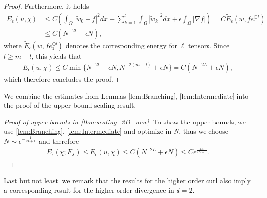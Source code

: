 \documentclass[a4paper, 10pt, twoside, notitlepage]{amsart}
\theoremstyle{plain}
\begin{document}
\begin{proof}
			Furthermore, it holds
			\begin{align*}
				E_{\epsilon}(u,\chi) &\leq C \left(\int_\Omega |\tilde{w}_0 - f|^2 dx + \sum_{k=1}^{l} \int_\Omega |\tilde{w}_k|^2 dx+ \epsilon \int_\Omega |\nabla f| \right) = C \tilde{E}_\epsilon(w,fe_1^{\odot l})\\
				& \leq C (N^{-2l} + \epsilon N),
			\end{align*}
			where $\tilde{E}_\epsilon(w,fe_1^{\odot l})$ denotes the corresponding energy for $\ell$ tensors.
                      Since $l \geq m-l$, this yields that
                        \begin{align*}
				E_\epsilon(u,\chi) \leq C \min\{ N^{-2l} + \epsilon N, N^{-2(m-l)} + \epsilon N\} = C(N^{-2L} + \epsilon N),
			\end{align*}
                        which therefore concludes the proof.
		\end{proof}
		
			We combine the estimates from Lemmas \ref{lem:Branching}, \ref{lem:Intermediate} into the proof of the upper bound scaling result.
		
		\begin{proof}[Proof of upper bounds in \cref{thm:scaling_2D_new}]
			To show the upper bounds, we use \cref{lem:Branching}, \cref{lem:Intermediate} and optimize in $N$, thus we choose $N \sim \epsilon^{-\frac{1}{2L+1}}$ and therefore
			\begin{align*}
				E_\epsilon(\chi;F_\lambda) \leq E_\epsilon(u,\chi) \leq C (N^{-2L} + \epsilon N) \leq C\epsilon^{\frac{2L}{2L+1}}.
			\end{align*}
		\end{proof}
		
	Last but not least, we remark that the results for the higher order curl also imply a corresponding result for the higher order divergence in $d=2$.
		
\end{document}
